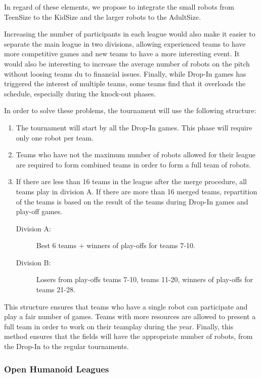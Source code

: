 \documentclass{article}
\begin{document}
In regard of these elements, we propose to integrate the small robots from
TeenSize to the KidSize and the larger robots to the AdultSize.

Increasing the number of participants in each league would also make it easier
to separate the main league in two divisions, allowing experienced teams to have
more competitive games and new teams to have a more interesting event.
It would also be interesting to increase the average number of robots on
the pitch without loosing teams du to financial issues.
Finally, while Drop-In games has triggered the interest of multiple teams,
some teams find that it overloads the schedule, especially during the knock-out
phases.

In order to solve these problems, the tournament will use the following
structure:
\begin{enumerate}
\item The tournament will start by all the Drop-In games. This phase will
  require only one robot per team.
\item Teams who have not the maximum number of robots allowed for their league
  are required to form combined teams in order to form a full team of robots.
\item If there are less than 16 teams in the league after the merge procedure,
  all teams play in division A.
  If there are more than 16 merged teams, repartition of the teams is based
  on the result of the teams during Drop-In games and play-off games.
  \begin{description}
  \item[Division A:] Best 6 teams + winners of play-offs for teams 7-10.
  \item[Division B:] Losers from play-offs teams 7-10, teams 11-20,
    winners of play-offs for teams 21-28.
  \end{description}
\end{enumerate}

This structure ensures that teams who have a single robot can participate and
play a fair number of games.
Teams with more resources are allowed to present a full team in order to work
on their teamplay during the year.
Finally, this method ensures that the fields will have the appropriate number
of robots, from the Drop-In to the regular tournaments.

\subsubsection{Open Humanoid Leagues}
\end{document}
